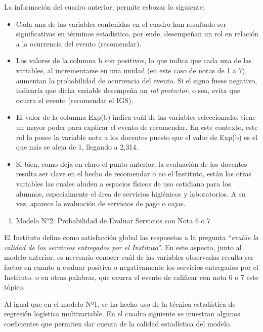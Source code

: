 \documentclass[]{book}
\providecommand{\tightlist}{%
  \setlength{\itemsep}{0pt}\setlength{\parskip}{0pt}}
\begin{document}
La información del cuadro anterior, permite esbozar lo siguiente:

\begin{itemize}
\item
  Cada una de las variables contenidas en el cuadro han resultado ser
  significativas en términos estadístico, por ende, desempeñan un rol en
  relación a la ocurrencia del evento (recomendar).
\item
  Los valores de la columna b son positivos, lo que indica que cada una
  de las variables, al incrementarse en una unidad (en este caso de
  notas de 1 a 7), aumentan la probabilidad de ocurrencia del evento. Si
  el signo fuese negativo, indicaría que dicha variable desempeña un
  \emph{rol protector}, o sea, evita que ocurra el evento (recomendar el
  IGS).
\item
  El valor de la columna Exp(b) indica cuál de las variables
  seleccionadas tiene un mayor poder para explicar el evento de
  recomendar. En este contexto, este rol lo posee la variable nota a los
  docentes puesto que el valor de Exp(b) es el que más se aleja de 1,
  llegando a 2,314.
\item
  Si bien, como deja en claro el punto anterior, la evaluación de los
  docentes resulta ser clave en el hecho de recomendar o no el
  Instituto, están las otras variables las cuales aluden a espacios
  físicos de uso cotidiano para los alumnos, especialmente el área de
  servicios higiénicos y laboratorios. A su vez, aparece la evaluación
  de servicios de pago o cajas.
\end{itemize}

\begin{enumerate}
\def\labelenumi{\alph{enumi})}
\setcounter{enumi}{1}
\tightlist
\item
  Modelo Nº2: Probabilidad de Evaluar Servicios con Nota 6 o 7
\end{enumerate}

El Instituto define como satisfacción global las respuestas a la
pregunta ``\emph{evalúe la calidad de los servicios entregados por el
Instituto}''. En este aspecto, junto al modelo anterior, es necesario
conocer cuál de las variables observadas resulta ser factor en cuanto a
evaluar positiva o negativamente los servicios entregados por el
Instituto, o en otras palabras, que ocurra el evento de calificar con
nota 6 o 7 este tópico.

Al igual que en el modelo Nº1, se ha hecho uso de la técnica estadística
de regresión logística multivariable. En el cuadro siguiente se muestran
algunos coeficientes que permiten dar cuenta de la calidad estadística
del modelo.
\end{document}
